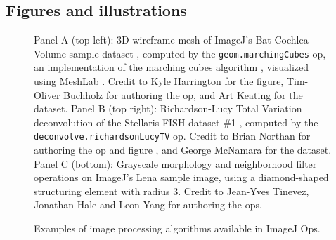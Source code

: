 \documentclass{bmcart}
\begin{document}
\begin{backmatter}




\section*{Figures and illustrations}
  \begin{figure}[h!]
    \caption{Examples of image processing algorithms available in ImageJ Ops.}
    \begin{flushleft}
      Panel A (top left): 3D wireframe mesh of ImageJ's Bat Cochlea Volume
      sample dataset \cite{bat_cochlea_volume}, computed by the
      \texttt{geom.marchingCubes} op, an implementation of the marching cubes
      algorithm \cite{marching_cubes}, visualized using MeshLab \cite{meshlab}.
      Credit to Kyle Harrington for the figure, Tim-Oliver Buchholz for
      authoring the op, and Art Keating for the dataset. Panel B (top right):
      Richardson-Lucy Total Variation deconvolution \cite{richardson_lucy} of
      the Stellaris FISH dataset \#1 \cite{stellaris_fish}, computed by the
      \texttt{deconvolve.richardsonLucyTV} op. Credit to Brian Northan for
      authoring the op and figure \cite{bnorthan_ops_decon}, and George
      McNamara for the dataset. Panel C (bottom): Grayscale morphology and
      neighborhood filter operations on ImageJ's Lena sample image, using a
      diamond-shaped structuring element with radius 3. Credit to Jean-Yves
      Tinevez, Jonathan Hale and Leon Yang for authoring the ops.
    \end{flushleft}
  \end{figure}


\end{backmatter}
\end{document}
